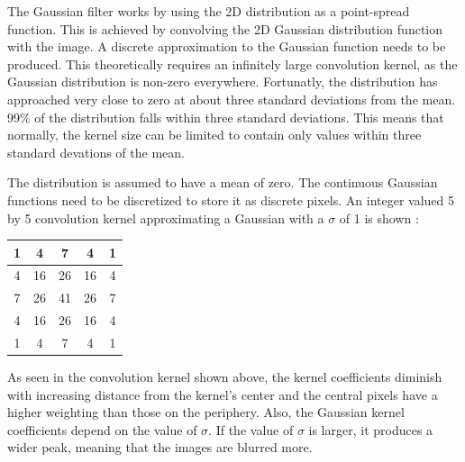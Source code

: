 The Gaussian filter works by using the 2D distribution as a point-spread function. This is achieved by convolving the 2D Gaussian distribution function with the image. A discrete approximation to the Gaussian function needs to be produced. This theoretically requires an infinitely large convolution kernel, as the Gaussian distribution is non-zero everywhere. Fortunatly, the distribution has approached very close to zero at about three standard deviations from the mean. 99\% of the distribution falls within three standard deviations. This means that normally, the kernel size can be limited to contain only values within three standard devations of the mean.

The distribution is assumed to have a mean of zero. The continuous Gaussian functions need to be discretized to store it as discrete pixels. An integer valued 5 by 5 convolution kernel approximating a Gaussian with a $ \sigma $ of 1 is shown\cite{GaussianBlur} : 




\begin{center}
\begin{tabular}{ | c | c | c | c | c |} \hline
  
  1 & 4  & 7  & 4  & 1  \\ \hline  
  4 & 16 & 26 & 16 & 4   \\ \hline  
  7 & 26 & 41 & 26 & 7   \\ \hline 
  4 & 16 & 26 & 16 & 4   \\ \hline 
  1 & 4  & 7  & 4  & 1  \\ \hline   
    
      \end{tabular}
  \label{tab:GaussianBlur}
\end{center}


As seen in the convolution kernel shown above, the kernel coefficients diminish with increasing distance from the kernel's center and the central pixels have a higher weighting than those on the periphery. Also, the Gaussian kernel coefficients depend on the value of $\sigma$. If the value of $\sigma$ is larger, it produces a wider peak, meaning that the images are blurred more.






















